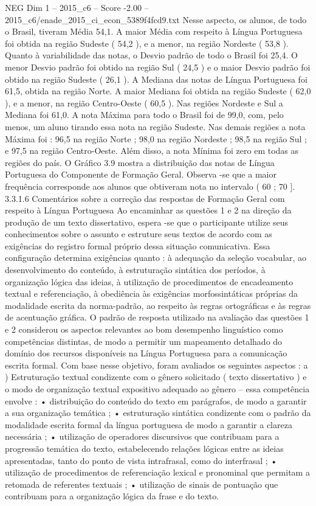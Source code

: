 \begin{textsample}{NEG Dim 1 – 2015\_c6 – Score -2.00 – 2015\_c6/enade\_2015\_ci\_econ\_5389f4fcd9.txt}
Nesse aspecto, os alunos, de todo o Brasil, tiveram Média 54,1.
A maior Média com respeito à Língua Portuguesa foi obtida na região Sudeste ( 54,2 ), e a menor, na região Nordeste ( 53,8 ).
Quanto à variabilidade das notas, o Desvio padrão de todo o Brasil foi 25,4.
O menor Desvio padrão foi obtido na região Sul ( 24,5 ) e o maior Desvio padrão foi obtido na região Sudeste ( 26,1 ).
A Mediana das notas de Língua Portuguesa foi 61,5, obtida na região Norte.
A maior Mediana foi obtida na região Sudeste ( 62,0 ), e a menor, na região Centro-Oeste ( 60,5 ).
Nas regiões Nordeste e Sul a Mediana foi 61,0.
A nota Máxima para todo o Brasil foi de 99,0, com, pelo menos, um aluno tirando essa nota na região Sudeste.
Nas demais regiões a nota Máxima foi : 96,5 na região Norte ; 98,0 na região Nordeste ; 98,5 na região Sul ; e 97,5 na região Centro-Oeste.
Além disso, a nota Mínima foi zero em todas as regiões do país.
O Gráfico 3.9 mostra a distribuição das notas de Língua Portuguesa do Componente de Formação Geral.
Observa -se que a maior frequência corresponde aos alunos que obtiveram nota no intervalo ( 60 ; 70 ]. 3.3.1.6 Comentários sobre a correção das respostas de Formação Geral com respeito à Língua Portuguesa Ao encaminhar as questões 1 e 2 na direção da produção de um texto dissertativo, espera -se que o participante utilize seus conhecimentos sobre o assunto e estruture seus textos de acordo com as exigências do registro formal próprio dessa situação comunicativa.
Essa configuração determina exigências quanto : à adequação da seleção vocabular, ao desenvolvimento do conteúdo, à estruturação sintática dos períodos, à organização lógica das ideias, à utilização de procedimentos de encadeamento textual e referenciação, à obediência às exigências morfossintáticas próprias da modalidade escrita da norma-padrão, ao respeito às regras ortográficas e às regras de acentuação gráfica.
O padrão de resposta utilizado na avaliação das questões 1 e 2 considerou os aspectos relevantes ao bom desempenho linguístico como competências distintas, de modo a permitir um mapeamento detalhado do domínio dos recursos disponíveis na Língua Portuguesa para a comunicação escrita formal.
Com base nesse objetivo, foram avaliados os seguintes aspectos : a ) Estruturação textual condizente com o gênero solicitado ( texto dissertativo ) e o modo de organização textual expositivo adequado ao gênero – essa competência envolve : • distribuição do conteúdo do texto em parágrafos, de modo a garantir a sua organização temática ; • estruturação sintática condizente com o padrão da modalidade escrita formal da língua portuguesa de modo a garantir a clareza necessária ; • utilização de operadores discursivos que contribuam para a progressão temática do texto, estabelecendo relações lógicas entre as ideias apresentadas, tanto do ponto de vista intrafrasal, como do interfrasal ; • utilização de procedimentos de referenciação lexical e pronominal que permitam a retomada de referentes textuais ; • utilização de sinais de pontuação que contribuam para a organização lógica da frase e do texto.

\end{textsample}
